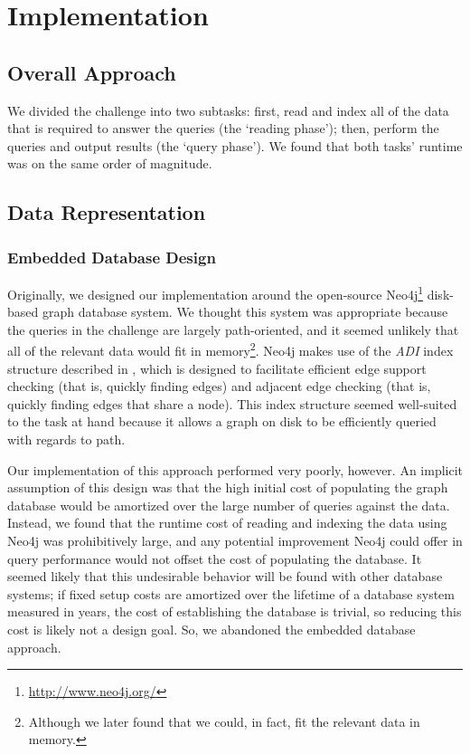 \documentclass{article}
\begin{document}

\section{Implementation}
\subsection{Overall Approach}
We divided the challenge into two subtasks: first, read and index all
of the data that is required to answer the queries (the `reading
phase'); then, perform the queries and output results (the `query
phase').  We found that both tasks' runtime was on the same order of
magnitude.  

\subsection{Data Representation}
\subsubsection{Embedded Database Design}
Originally, we designed our implementation around the open-source
Neo4j\footnote{\url{http://www.neo4j.org/}} disk-based graph database
system.  We thought this system was appropriate because the queries in
the challenge are largely path-oriented, and it seemed unlikely that
all of the relevant data would fit in memory\footnote{Although we
  later found that we could, in fact, fit the relevant data in
  memory.}.  Neo4j makes use of the \emph{ADI} index structure
\cite[Chapter~6]{IanRobinson:2013ul} described in
\cite{wang2004scalable}, which is designed to facilitate efficient
edge support checking (that is, quickly finding edges) and adjacent
edge checking (that is, quickly finding edges that share a node).
This index structure seemed well-suited to the task at hand because it
allows a graph on disk to be efficiently queried with regards to path.

Our implementation of this approach performed very poorly, however.
An implicit assumption of this design was that the high initial cost of
populating the graph database would be amortized over the large number
of queries against the data.  Instead, we found that the runtime cost 
of reading and indexing the data using Neo4j was prohibitively large,
and any potential improvement Neo4j could offer in query performance
would not offset the cost of populating the database.
It seemed likely that this undesirable behavior will be found
with other database systems; if fixed setup costs are amortized over
the lifetime of a database system measured in years, the cost of
establishing the database is trivial, so reducing this cost is likely
not a design goal.  So, we abandoned the embedded database approach.
\end{document}

